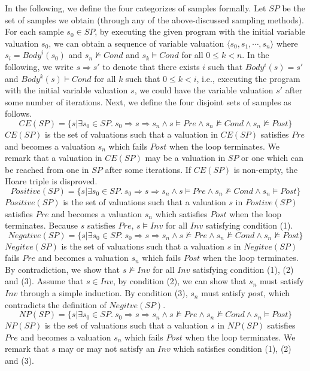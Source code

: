 \noindent
In the following, we define the four categorizes of samples formally. Let $\mathit{SP}$ be the set of samples we obtain (through any of the above-discussed sampling methods). For each sample $s_0 \in \mathit{SP}$, by executing the given program with the initial variable valuation $s_0$, we can obtain a sequence of variable valuation $\langle s_0, s_1, \cdots, s_n \rangle$ where $s_i = \mathit{Body}^i(s_0)$ and $s_n \not \models \mathit{Cond}$ and $s_k \models \mathit{Cond}$ for all $0 \leq k < n$. In the following, we write $s \Rightarrow s'$ to denote that there exists $i$ such that $Body^i(s) = s'$ and $Body^k(s) \models Cond$ for all $k$ such that $0 \leq k < i$, i.e., executing the program with the initial variable valuation $s$, we could have the variable valuation $s'$ after some number of iterations.
Next, we define the four disjoint sets of samples as follows.
\[
\mathit{CE}(\mathit{SP}) = \{s | \exists s_0 \in SP.~s_0 \Rightarrow s \Rightarrow s_n \land s \models Pre \land s_n \not \models Cond \land s_n \not \models \mathit{Post}\} \]
$CE(SP)$ is the set of valuations such that a valuation in $CE(SP)$ satisfies $Pre$ and becomes a valuation $s_n$ which fails $Post$ when the loop terminates. We remark that a valuation in $CE(SP)$ may be a valuation in $SP$ or one which can be reached from one in $SP$ after some iterations. If $\mathit{CE}(\mathit{SP})$ is non-empty, the Hoare triple is disproved.
\[
 \mathit{Positive}(\mathit{SP}) = \{s | \exists s_0 \in SP.~s_0 \Rightarrow s \Rightarrow s_n \land s \models \mathit{Pre} \land s_n \not \models Cond \land s_n \models \mathit{Post}\}
 \]
$Positive(SP)$ is the set of valuations such that a valuation $s$ in $Postive(SP)$ satisfies $Pre$ and becomes a valuation $s_n$ which satisfies $Post$ when the loop terminates. Because $s$ satisfies $Pre$, $s \models \mathit{Inv}$ for all $\mathit{Inv}$ satisfying condition (1).
 \[
    \mathit{Negative}(\mathit{SP}) = \{s | \exists s_0 \in SP.~s_0 \Rightarrow s \Rightarrow s_n \land s \not \models \mathit{Pre} \land s_n \not \models Cond \land s_n \not \models Post\} \]
$Negitve(SP)$ is the set of valuations such that a valuation $s$ in $Negitve(SP)$ fails $Pre$ and becomes a valuation $s_n$ which fails $Post$ when the loop terminates. By contradiction, we show that $s \not \models \mathit{Inv}$ for all $\mathit{Inv}$ satisfying condition (1), (2) and (3). Assume that $s \in Inv$, by condition (2), we can show that $s_n$ must satisfy $Inv$ through a simple induction. By condition (3), $s_n$ must satisfy $post$, which contradicts the definition of $Negitve(SP)$. 
\[    \mathit{NP}(\mathit{SP}) = \{s | \exists s_0 \in SP.~ s_0 \Rightarrow s \Rightarrow s_n \land s \not \models \mathit{Pre} \land s_n \not \models Cond \land s_n \models \mathit{Post}\}
\]
$NP(SP)$ is the set of valuations such that a valuation $s$ in $NP(SP)$ satisfies $Pre$ and becomes a valuation $s_n$ which fails $Post$ when the loop terminates. We remark that $s$ may or may not satisfy an $Inv$ which satisfies condition (1), (2) and (3).

